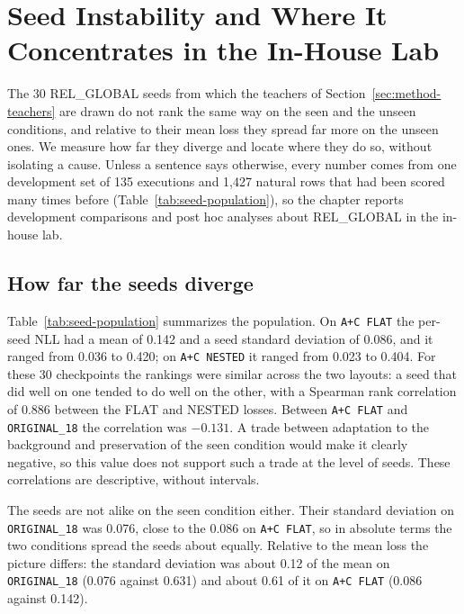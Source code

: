 \chapter{Seed Instability and Where It Concentrates in the In-House Lab}
\label{ch:diagnosis}

The 30 REL\_GLOBAL seeds from which the teachers of
Section~\ref{sec:method-teachers} are drawn do not rank the same way on
the seen and the unseen conditions, and relative to their mean loss
they spread far more on the unseen ones. We measure how far they
diverge and locate where they do so, without isolating a cause.
Unless a sentence says otherwise, every number comes from one
development set of 135 executions and 1,427 natural rows that had been
scored many times before (Table~\ref{tab:seed-population}), so the
chapter reports development comparisons and post hoc analyses about
REL\_GLOBAL in the in-house lab.

\section{How far the seeds diverge}
\label{sec:diag-size}

Table~\ref{tab:seed-population} summarizes the population. On
\texttt{A+C FLAT} the per-seed NLL had a mean of 0.142 and a seed
standard deviation of 0.086, and it ranged from 0.036 to 0.420; on
\texttt{A+C NESTED} it ranged from 0.023 to 0.404. For these 30
checkpoints the rankings were similar across the two layouts: a seed
that did well on one tended to do well on the other, with a Spearman
rank correlation of 0.886 between the FLAT and NESTED losses.
Between \texttt{A+C FLAT} and
\texttt{ORIGINAL\_18} the correlation was $-0.131$. A trade between adaptation to the background and preservation of the
seen condition would make it clearly negative, so this value does not
support such a trade at the level of seeds. These correlations are
descriptive, without intervals.

The seeds are not alike on the seen condition either. Their standard
deviation on \texttt{ORIGINAL\_18} was 0.076, close to the 0.086 on
\texttt{A+C FLAT}, so in absolute terms the two conditions spread the
seeds about equally. Relative to the mean loss the picture differs: the
standard deviation was about 0.12 of the mean on \texttt{ORIGINAL\_18}
(0.076 against 0.631) and about 0.61 of it on \texttt{A+C FLAT} (0.086
against 0.142).

